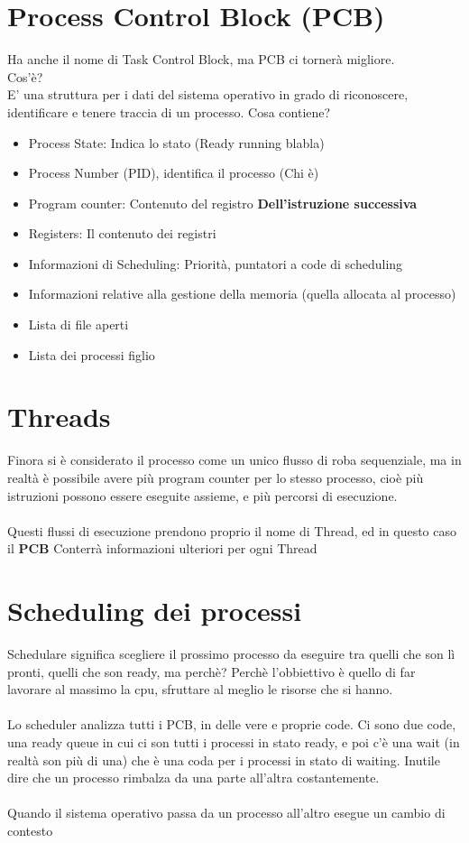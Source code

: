 \documentclass[12pt, a4paper, openany, twoside]{book}
\begin{document}
\section{Process Control Block (PCB)}
Ha anche il nome di Task Control Block, ma PCB ci tornerà migliore. \\
Cos'è? \\
E' una struttura per i dati del sistema operativo in grado di riconoscere, 
identificare e tenere traccia di un processo.
Cosa contiene?\\ 
\begin{itemize}
	\item Process State: Indica lo stato (Ready running blabla)
	\item Process Number (PID), identifica il processo (Chi è)
	\item Program counter: Contenuto del registro \color{red} \textbf{Dell'istruzione
	successiva} \color{black}
	\item Registers: Il contenuto dei registri
	\item Informazioni di Scheduling: Priorità, puntatori a code di scheduling
	\item Informazioni relative alla gestione della memoria (quella allocata al processo)
	\item Lista di file aperti
	\item Lista dei processi figlio
\end{itemize}
\section{Threads}
Finora si è considerato il processo come un unico flusso di roba sequenziale,
ma in realtà è possibile avere più program counter per lo stesso processo, cioè
più istruzioni possono essere eseguite assieme, e più percorsi di esecuzione.
\\ \\
Questi flussi di esecuzione prendono proprio il nome di Thread, ed in questo caso
il \textbf{PCB} Conterrà informazioni ulteriori per ogni Thread  
\section{Scheduling dei processi}
Schedulare significa scegliere il prossimo processo da eseguire tra quelli che 
son lì pronti, quelli che son ready, ma perchè? Perchè l'obbiettivo è quello di 
far lavorare al massimo la cpu, sfruttare al meglio le risorse che si hanno. \\
\\ 
Lo scheduler analizza tutti i PCB, in delle vere e proprie code. Ci sono due code,
una ready queue in cui ci son tutti i processi in stato ready, e poi c'è una 
wait (in realtà son più di una) che è una coda per i processi in stato di waiting.
Inutile dire che un processo rimbalza da una parte all'altra costantemente.
\\ \\
Quando il sistema operativo passa da un processo all'altro esegue un cambio
di contesto 
\end{document}
